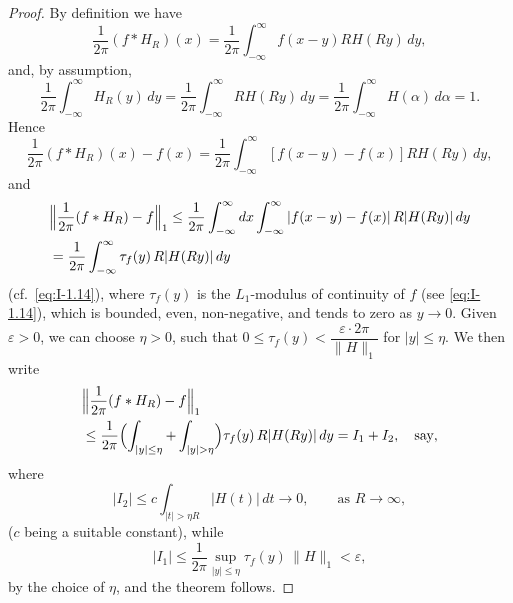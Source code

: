 \begin{proof}
By definition we have
\begin{equation*}
\frac{1}{2\pi}(f*H_R)(x)=\frac{1}{2\pi}\int_{-\infty}^{\infty}f(x-y)RH(Ry)\,dy,
\end{equation*}
and, by assumption,
\begin{equation*}
\frac{1}{2\pi}\int_{-\infty}^{\infty}H_R(y)\,dy
=\frac{1}{2\pi}\int_{-\infty}^{\infty}RH(Ry)\,dy
=\frac{1}{2\pi}\int_{-\infty}^{\infty}H(\alpha)\,d\alpha=1.
\end{equation*}
Hence
\begin{equation*}
\frac{1}{2\pi}(f*H_R)(x)-f(x)
=\frac{1}{2\pi}\int_{-\infty}^{\infty}[f(x-y)-f(x)]RH(Ry)\,dy,
\end{equation*}
and
\begin{equation*}
\begin{aligned}
&\Bigl\|\frac{1}{2\pi}(f*H_R)-f\Bigr\|_1 \le \frac{1}{2\pi}\int_{-\infty}^{\infty}dx\int_{-\infty}^{\infty}|f(x-y)-f(x)|\,R|H(Ry)|\,dy\\
&= \frac{1}{2\pi}\int_{-\infty}^{\infty}\tau_f(y)\,R|H(Ry)|\,dy
\end{aligned}
\end{equation*}
(cf.\ \eqref{eq:I-1.14}), where $\tau_f(y)$ is the $L_1$-modulus of continuity of $f$ (see \eqref{eq:I-1.14}), which is bounded, even, non-negative, and tends to zero as $y\to 0$. Given $\varepsilon>0$, we can choose $\eta>0$, such that $0\le\tau_f(y)<\dfrac{\varepsilon\cdot 2\pi}{\|H\|_1}$ for $|y|\le\eta$. We then write
\begin{equation*}
\begin{aligned}
&\Bigl\|\frac{1}{2\pi}(f*H_R) - f\Bigr\|_1\\
&\le \frac{1}{2\pi}  \Bigl(\int_{|y|\le\eta}+\int_{|y|>\eta}\Bigr)\tau_f(y)\,R|H(Ry)|\,dy = I_1 + I_2,\quad\text{say},
\end{aligned}
\end{equation*}
where
\begin{equation*}
|I_2|\le c\int_{|t|>\eta R}|H(t)|\,dt\to 0,\qquad\text{as }R\to\infty,
\end{equation*}
($c$ being a suitable constant), while
\begin{equation*}
|I_1|\le\frac{1}{2\pi}\sup_{|y|\le\eta}\tau_f(y)\,\|H\|_1<\varepsilon,
\end{equation*}
by the choice of $\eta$, and the theorem follows.
\end{proof}

